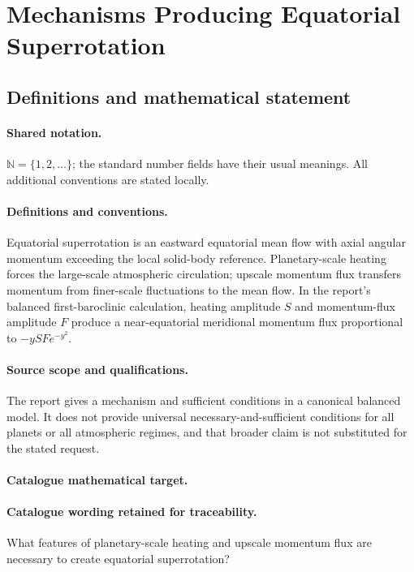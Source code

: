 \documentclass[11pt]{article}
\begin{document}
\section{Mechanisms Producing Equatorial Superrotation}\label{statement}

\subsection{Definitions and mathematical statement}

\paragraph{Shared notation.}$\mathbb N=\{1,2,\ldots\}$; the standard number fields have their usual meanings. All additional conventions are stated locally.


\paragraph{Definitions and conventions.} Equatorial superrotation is an eastward equatorial mean flow with axial angular momentum exceeding the local solid-body reference. Planetary-scale heating forces the large-scale atmospheric circulation; upscale momentum flux transfers momentum from finer-scale fluctuations to the mean flow. In the report's balanced first-baroclinic calculation, heating amplitude $S$ and momentum-flux amplitude $F$ produce a near-equatorial meridional momentum flux proportional to $-ySF e^{-y^2}$.

\paragraph{Source scope and qualifications.} The report gives a mechanism and sufficient conditions in a canonical balanced model. It does not provide universal necessary-and-sufficient conditions for all planets or all atmospheric regimes, and that broader claim is not substituted for the stated request.

\paragraph{Catalogue mathematical target.}
\paragraph{Catalogue wording retained for traceability.}
What features of planetary-scale heating and upscale momentum flux are necessary to create equatorial superrotation?
\end{document}
